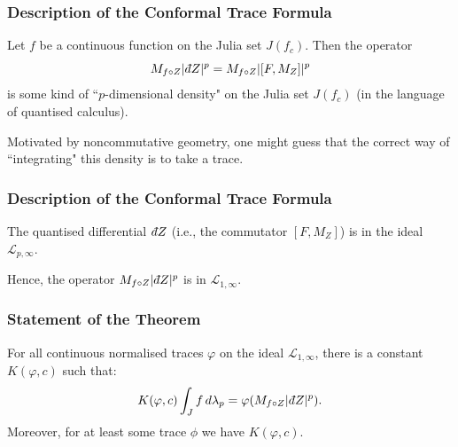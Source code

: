 \documentclass{beamer} %
\theoremstyle{definition} %
\newcommand{\Lc}{\mathcal{L}}
\def\qd{\,{\mathchar'26\mkern-12mu d}}
\begin{document}
\begin{frame}\frametitle{Description of the Conformal Trace Formula}
     Let $f$ be a continuous function on the Julia set $J(f_c)$. Then the operator
     \begin{equation*}
        M_{f\circ Z}|\qd Z|^p = M_{f\circ Z}|[F,M_Z]|^p
     \end{equation*}
     is some kind of ``$p$-dimensional density" on the Julia set $J(f_c)$ (in the language of quantised calculus).
     
     Motivated by noncommutative geometry, one might guess that the correct way of ``integrating" this density is to take a trace.
\end{frame}

\begin{frame}\frametitle{Description of the Conformal Trace Formula}
    \begin{lemma}
        The quantised differential $\qd Z$ (i.e., the commutator $[F,M_Z]$) is in the ideal $\Lc_{p,\infty}$.
    \end{lemma}
    Hence, the operator $M_{f\circ Z}|\qd Z|^p$ is in $\Lc_{1,\infty}$.
\end{frame}

\begin{frame}\frametitle{Statement of the Theorem}
    For all continuous normalised traces $\varphi$ on the ideal $\Lc_{1,\infty}$, there is a constant $K(\varphi,c)$ such that:
    \begin{equation*}
        K(\varphi,c)\int_J f\,d\lambda_p = \varphi(M_{f\circ Z}|\qd Z|^p).
    \end{equation*}
    Moreover, for at least some trace $\phi$ we have $K(\varphi,c)$.
\end{frame}
% 
\end{document}
